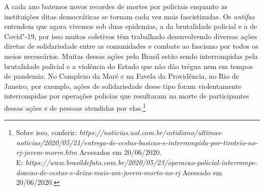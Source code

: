 A cada ano batemos novos recordes de mortes por policiais enquanto as
instituições ditas democráticas se tornam cada vez mais fascistizadas.
Os \emph{antifas} entendem que agora vivemos sob duas epidemias, a da
brutalidade policial e a de Covid"-19, por isso muitos coletivos têm
trabalhado desenvolvendo diversas ações diretas de solidariedade entre
as comunidades e combate ao fascismo por todos os meios necessários.
Muitas dessas ações pelo Brasil estão sendo interrompidas pela
brutalidade policial e a violência do Estado que não dão trégua nem em
tempos de pandemia. No Complexo da Maré e na Favela da Providência, no
Rio de Janeiro, por exemplo, ações de solidariedade desse tipo foram
violentamente interrompidas por operações policias que resultaram na
morte de participantes dessas ações e de pessoas atendidas por
elas.\footnote{Sobre isso, conferir:
  \emph{https://noticias.uol.com.br/cotidiano/ultimas-noticias/2020/05/21/entrega-de-cestas-basicas-e-interrompida-por-tiroteio-no-rj-jovem-morre.htm}
  Acessados em 20/06/2020.\\
  E:
\emph{https://www.brasildefato.com.br/2020/05/23/operacao-policial-interrompe-doacao-de-cestas-e-deixa-mais-um-jovem-morto-no-rj}
  Acessado em 20/06/2020.}

